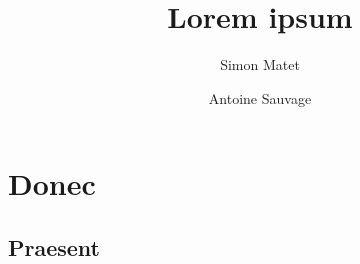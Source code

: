 \documentclass[a4paper]{article}
\title{Lorem ipsum}           %
\author{Simon Matet \and Antoine Sauvage}
\date{}                       %
\begin{document}
\maketitle                    %

\begin{abstract}
\end{abstract}

\tableofcontents              %


\section{Donec}               %

\subsection{Praesent}         %









\end{document}
